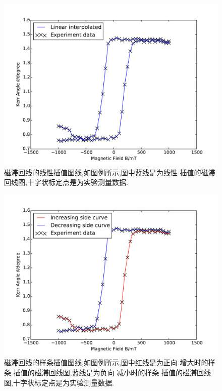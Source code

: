 \documentclass[aps,pre,12pt,preprint,onecolumn,showpacs,showkeys]{revtex4-1}
\begin{document}
\begin{figure}[htbp]
    \centering
    \includegraphics[width=\textwidth]{plot1.pdf}
    \caption{\label{fig:plot1}磁滞回线的线性插值图线,如图例所示,图中蓝线是为线性
        插值的磁滞回线图,十字状标定点是为实验测量数据.}
\end{figure}

\begin{figure}[htbp]
    \centering
    \includegraphics[width=\textwidth]{plot2.pdf}
    \caption{\label{fig:plot2}磁滞回线的样条插值图线,如图例所示,图中红线是为正向
        增大时的样条
        插值的磁滞回线图,蓝线是为负向
        减小时的样条
        插值的磁滞回线图,十字状标定点是为实验测量数据.}
\end{figure}
\end{document}
